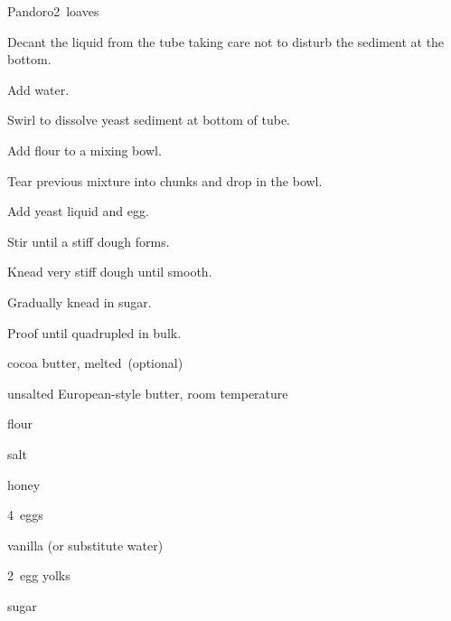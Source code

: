 \begin{recipe}{Pandoro}{}{2~loaves}
\begin{directions}
\item Decant the liquid from the tube taking care not to disturb the sediment at the bottom.
\item Add water.
\item Swirl to dissolve yeast sediment at bottom of tube.
\item Add flour to a mixing bowl.
\item Tear previous mixture into chunks and drop in the bowl.
\item Add yeast liquid and egg.
\item Stir until a stiff dough forms.
\item Knead very stiff dough until smooth.
\item Gradually knead in sugar.
\item Proof until quadrupled in bulk.
\end{directions}

\begin{ingredients}
\item {} cocoa butter, melted~(optional)
\item {} unsalted European-style butter, room temperature
\item {} flour
\item {} salt
\item {} honey
\item 4~eggs
\item {} vanilla (or substitute water)
\item 2~egg yolks
\item {} sugar
\end{ingredients}


\end{recipe}
